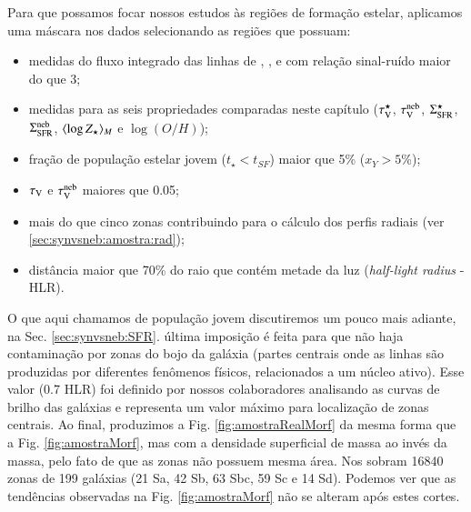 Para que possamos focar nossos estudos às regiões de formação estelar, aplicamos uma máscara nos
dados selecionando as regiões que possuam:
\begin{itemize}
  \item medidas do fluxo integrado das linhas de \Hbeta, \oIII, \Halpha e \nII com relação
sinal-ruído maior do que 3;
  \item medidas para as seis propriedades comparadas neste capítulo ($\tau_{\mathrm{V}}^\star$, $\tau_{\mathrm{V}}^{\mathrm{neb}}$,
$\Sigma_{\mathrm{SFR}}^\star$, $\Sigma_{\mathrm{SFR}}^{\mathrm{neb}}$, $\meanM{\log Z_\star}$ e $\log(O/H)$);
  \item fração de população estelar jovem ($t_\star < t_{SF}$) maior que 5\% ($x_Y > 5$\%);
  \item $\tau_{\mathrm{V}}$ e $\tau_{\mathrm{V}}^{\mathrm{neb}}$ maiores que 0.05;
  \item mais do que cinco zonas contribuindo para o cálculo dos perfis radiais (ver
  \ref{sec:synvsneb:amostra:rad});
  \item distância maior que 70\% do raio que contém metade da luz ({\em half-light radius} - HLR).
\end{itemize}
\noindent O que aqui chamamos de população jovem discutiremos um pouco mais adiante, na Sec.
\ref{sec:synvsneb:SFR}. última imposição é feita para que não haja contaminação por zonas
do bojo da galáxia (partes centrais onde as linhas são produzidas por diferentes fenômenos físicos,
relacionados a um núcleo ativo). Esse valor (0.7 HLR) foi definido por nossos colaboradores
analisando as curvas de brilho das galáxias e representa um valor máximo para localização de zonas
centrais. Ao final, produzimos a Fig. \ref{fig:amostraRealMorf} da mesma forma que a Fig.
\ref{fig:amostraMorf}, mas com a densidade superficial de massa ao invés da massa, pelo fato de que
as zonas não possuem mesma área. Nos sobram 16840 zonas de 199 galáxias (21 Sa, 42 Sb, 63 Sbc, 59 Sc
e 14 Sd). Podemos ver que as tendências observadas na Fig. \ref{fig:amostraMorf} não se alteram após
estes cortes.

